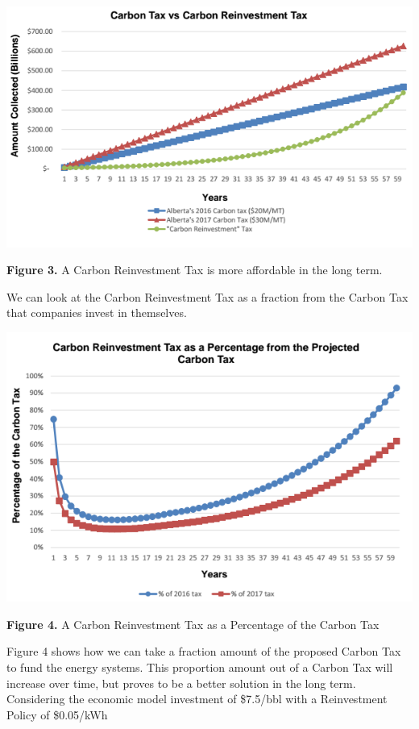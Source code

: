 \documentclass[11pt]{article}
\begin{document}
\begin{center}
\includegraphics[scale=0.65]{g3.png}
\end{center}
\begin{center}
{\bf Figure 3.}  A Carbon Reinvestment Tax is more affordable in the long term.
\end{center}

We can look at the Carbon Reinvestment Tax as a fraction from the Carbon Tax that companies invest in themselves.

\begin{center}
\includegraphics[scale=0.65]{g4.png}
\end{center}
\begin{center}
{\bf Figure 4.} A Carbon Reinvestment Tax as a Percentage of the Carbon Tax
\end{center}

Figure 4 shows how we can take a fraction amount of the proposed Carbon Tax to fund the energy systems. This proportion amount out of a Carbon Tax will increase over time, but proves to be a better solution in the long term. Considering the economic model investment of \$7.5/bbl with a Reinvestment Policy of \$0.05/kWh 
\end{document}
